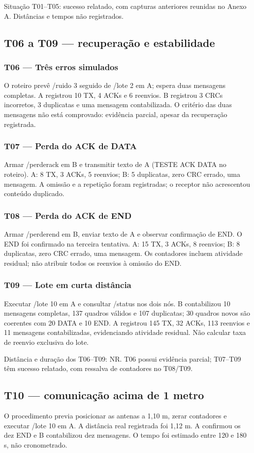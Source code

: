 {\small Situação T01–T05: sucesso relatado, com capturas anteriores reunidas no Anexo A. Distâncias e tempos não registrados.\par}
\setcounter{subsection}{1}\subsection{T06 a T09 — recuperação e estabilidade}
\subsubsection*{T06 — Três erros simulados}
O roteiro prevê /ruido 3 seguido de /lote 2 em A; espera duas mensagens completas. A registrou 10 TX, 4 ACKs e 6 reenvios. B registrou 3 CRCs incorretos, 3 duplicatas e uma mensagem contabilizada. O critério das duas mensagens não está comprovado: evidência parcial, apesar da recuperação registrada.

\subsubsection*{T07 — Perda do ACK de DATA}
Armar /perderack em B e transmitir texto de A (TESTE ACK DATA no roteiro). A: 8 TX, 3 ACKs, 5 reenvios; B: 5 duplicatas, zero CRC errado, uma mensagem. A omissão e a repetição foram registradas; o receptor não acrescentou conteúdo duplicado.

\subsubsection*{T08 — Perda do ACK de END}
Armar /perderend em B, enviar texto de A e observar confirmação de END. O END foi confirmado na terceira tentativa. A: 15 TX, 3 ACKs, 8 reenvios; B: 8 duplicatas, zero CRC errado, uma mensagem. Os contadores incluem atividade residual; não atribuir todos os reenvios à omissão do END.

\subsubsection*{T09 — Lote em curta distância}
Executar /lote 10 em A e consultar /status nos dois nós. B contabilizou 10 mensagens completas, 137 quadros válidos e 107 duplicatas; 30 quadros novos são coerentes com 20 DATA e 10 END. A registrou 145 TX, 32 ACKs, 113 reenvios e 11 mensagens contabilizadas, evidenciando atividade residual. Não calcular taxa de reenvio exclusiva do lote.

{\small Distância e duração dos T06–T09: NR. T06 possui evidência parcial; T07–T09 têm sucesso relatado, com ressalva de contadores no T08/T09.\par}
\setcounter{subsection}{2}\subsection{T10 — comunicação acima de 1 metro}
O procedimento previa posicionar as antenas a 1,10 m, zerar contadores e executar /lote 10 em A. A distância real registrada foi 1,12 m. A confirmou os dez END e B contabilizou dez mensagens. O tempo foi estimado entre 120 e 180 s, não cronometrado.


